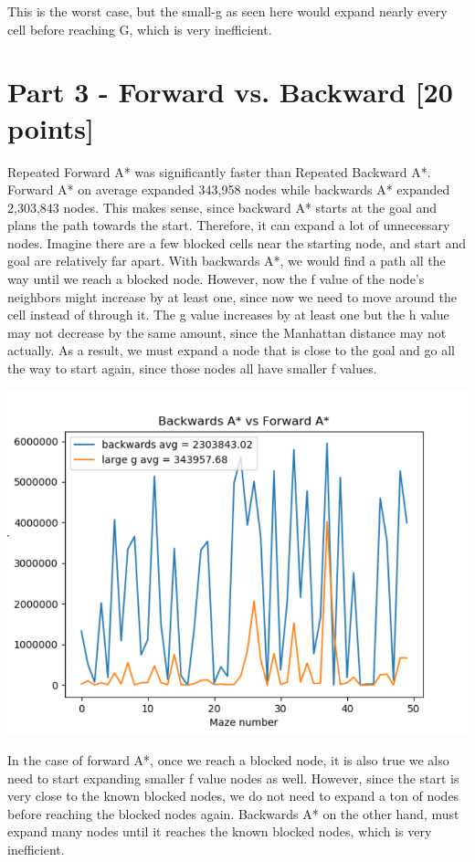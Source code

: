 \documentclass[a4paper]{article}
\theoremstyle{definition}
\theoremstyle{plain}
\begin{document}
This is the worst case, but the small-g as seen here would expand nearly every cell before reaching G, which is very inefficient.

\section*{Part 3 - Forward vs. Backward [20 points]}
Repeated Forward A* was significantly faster than Repeated Backward A*. Forward A* on average expanded 343,958 nodes while backwards A* expanded 2,303,843 nodes. This makes sense, since backward A* starts at the goal and plans the path towards the start. Therefore, it can expand a lot of unnecessary nodes. Imagine there are a few blocked cells near the starting node, and start and goal are relatively far apart. With backwards A*, we would find a path all the way until we reach a blocked node. However, now the f value of the node’s neighbors might increase by at least one, since now we need to move around the cell instead of through it. The g value increases by at least one but the h value may not decrease by the same amount, since the Manhattan distance may not actually. As a result, we must expand a node that is close to the goal and go all the way to start again, since those nodes all have smaller f values. \\
\begin{center}
\includegraphics[scale=.6]{backvsforw.PNG}
\end{center}
In the case of forward A*, once we reach a blocked node, it is also true we also need to start expanding smaller f value nodes as well. However, since the start is very close to the known blocked nodes, we do not need to expand a ton of nodes before reaching the blocked nodes again. Backwards A* on the other hand, must expand many nodes until it reaches the known blocked nodes, which is very inefficient.\\
\end{document}

